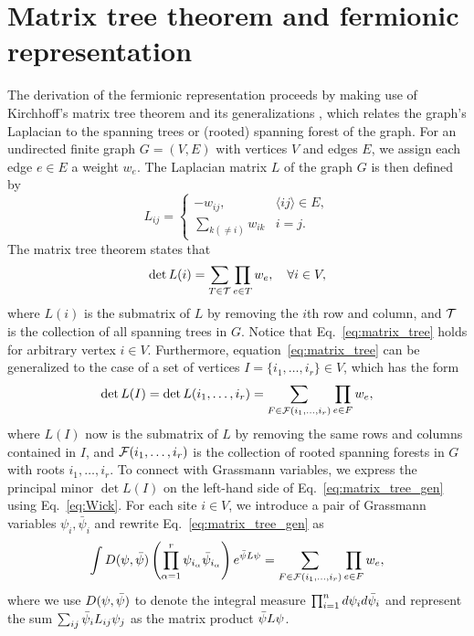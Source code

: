 \section{Matrix tree theorem and fermionic representation}
The derivation of the fermionic representation proceeds by making use of Kirchhoff's matrix tree theorem \cite{Kirchhoff1847} and its
generalizations \cite{Chaiken1982, Moon1994}, which relates the graph's Laplacian to the spanning trees or (rooted) spanning forest of the graph. 
For an undirected finite graph $G = (V, E)$ with vertices $V$ and edges $E$, we assign each edge $e \in E$ a weight $w_e$. The Laplacian matrix $L$ of 
the graph $G$ is then defined by
\begin{equation}
	L_{ij} =
	\begin{cases}
	-w_{ij}, & \langle ij \rangle \in E, \\
	\sum_{k(\neq i)} w_{ik} & i = j.
	\end{cases}
\end{equation}
The matrix tree theorem states that
\begin{equation}\label{eq:matrix_tree}
	\operatorname{det} L(i) = \sum_{T \in {\mathcal T}} \prod_{e\in T} w_e, \quad \forall i \in V,
\end{equation}
where $L(i)$ is the submatrix of $L$ by removing the $i$th row and column, and ${\mathcal T}$ is the collection of all spanning trees in $G$.
Notice that Eq.~\eqref{eq:matrix_tree} holds for arbitrary vertex $i \in V$. Furthermore, equation~\eqref{eq:matrix_tree} can be 
generalized to the case of a set of vertices $I = \{i_1, \dots, i_r\} \in V$, which has the form
\begin{equation}\label{eq:matrix_tree_gen}
	\operatorname{det}L(I) = \operatorname{det}L (i_1, \dots, i_r) = \sum_{F \in {\mathcal F}(i_1, \dots, i_r)} \prod_{e \in F} w_e, 
\end{equation}
where $L(I)$ now is the submatrix of $L$ by removing the same rows and columns contained in $I$, and ${\mathcal F}(i_1, \dots, i_r)$ is the collection
of rooted spanning forests in $G$ with roots $i_1, \dots, i_r$.
To connect with Grassmann variables, we express the principal minor $\operatorname{det} L(I)$ on the left-hand side of Eq.~\eqref{eq:matrix_tree_gen} using Eq.~\eqref{eq:Wick}.
For each site $i \in V$, we introduce a pair of Grassmann variables $\psi_i, \bar{\psi}_i$ and rewrite Eq.~\eqref{eq:matrix_tree_gen} as
\begin{equation}\label{eq:matrix_tree_Grassmann}
	\int D({\psi}, \bar{{\psi}})\left(\prod_{\alpha=1}^r \psi_{i_{\alpha}} \bar{\psi}_{i_{\alpha}}\right)e^{\bar{{\psi}} L {\psi}} 
	=\sum_{F \in {\mathcal F}(i_1, \dots, i_r)} \prod_{e \in F} w_e, 
\end{equation}
where we use $D({\psi}, \bar{{\psi}})$ to denote the integral measure $\prod_{i=1}^n d{\psi}_i d\bar{{\psi}}_i$ and 
represent the sum $\sum_{ij} \bar{{\psi}}_i L_{ij} {\psi}_j$ as the matrix product $\bar{{\psi}} L {\psi}$. 


